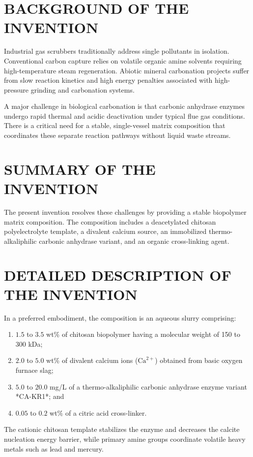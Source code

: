 \documentclass[12pt,a4paper]{article}
\begin{document}
\section*{BACKGROUND OF THE INVENTION}
Industrial gas scrubbers traditionally address single pollutants in isolation. Conventional carbon capture relies on volatile organic amine solvents requiring high-temperature steam regeneration. Abiotic mineral carbonation projects suffer from slow reaction kinetics and high energy penalties associated with high-pressure grinding and carbonation systems. 

A major challenge in biological carbonation is that carbonic anhydrase enzymes undergo rapid thermal and acidic deactivation under typical flue gas conditions. There is a critical need for a stable, single-vessel matrix composition that coordinates these separate reaction pathways without liquid waste streams.

\section*{SUMMARY OF THE INVENTION}
The present invention resolves these challenges by providing a stable biopolymer matrix composition. The composition includes a deacetylated chitosan polyelectrolyte template, a divalent calcium source, an immobilized thermo-alkaliphilic carbonic anhydrase variant, and an organic cross-linking agent.

\section*{DETAILED DESCRIPTION OF THE INVENTION}
In a preferred embodiment, the composition is an aqueous slurry comprising:
\begin{enumerate}
    \item $1.5$ to $3.5$ wt\% of chitosan biopolymer having a molecular weight of 150 to 300 kDa;
    \item $2.0$ to $5.0$ wt\% of divalent calcium ions ($\text{Ca}^{2+}$) obtained from basic oxygen furnace slag;
    \item $5.0$ to $20.0$ mg/L of a thermo-alkaliphilic carbonic anhydrase enzyme variant *CA-KR1*; and
    \item $0.05$ to $0.2$ wt\% of a citric acid cross-linker.
\end{enumerate}

The cationic chitosan template stabilizes the enzyme and decreases the calcite nucleation energy barrier, while primary amine groups coordinate volatile heavy metals such as lead and mercury.
\end{document}
